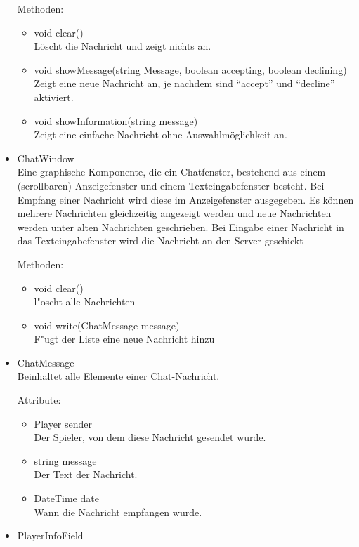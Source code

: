 \documentclass[a4paper,10pt]{article}
\begin{document}
\begin{itemize}
Methoden:
\begin{itemize}
\item void clear() 
\\Löscht die Nachricht und zeigt nichts an.
\item void showMessage(string Message, boolean accepting, boolean declining)
\\Zeigt eine neue Nachricht an, je nachdem sind "`accept"' und "`decline"' aktiviert.
\item void showInformation(string message)
\\Zeigt eine einfache Nachricht ohne Auswahlmöglichkeit an.
\end{itemize}

\item ChatWindow\\
Eine graphische Komponente, die ein Chatfenster, bestehend aus einem (scrollbaren) Anzeigefenster und einem Texteingabefenster besteht. Bei Empfang einer Nachricht wird diese im Anzeigefenster ausgegeben. Es können mehrere Nachrichten gleichzeitig angezeigt werden und neue Nachrichten werden unter alten Nachrichten geschrieben. Bei Eingabe einer Nachricht in das Texteingabefenster wird die Nachricht an den Server geschickt

Methoden:
\begin{itemize}
\item void clear()
\\ l"oscht alle Nachrichten
\item void write(ChatMessage message)
\\F"ugt der Liste eine neue Nachricht hinzu
\end{itemize}

\item ChatMessage \\
Beinhaltet alle Elemente einer Chat-Nachricht.

Attribute:
\begin{itemize}
\item Player sender
\\Der Spieler, von dem diese Nachricht gesendet wurde.
\item string message
\\Der Text der Nachricht.
\item DateTime date
\\Wann die Nachricht empfangen wurde.
\end{itemize}

\item PlayerInfoField\\


\end{itemize}
\end{document}
